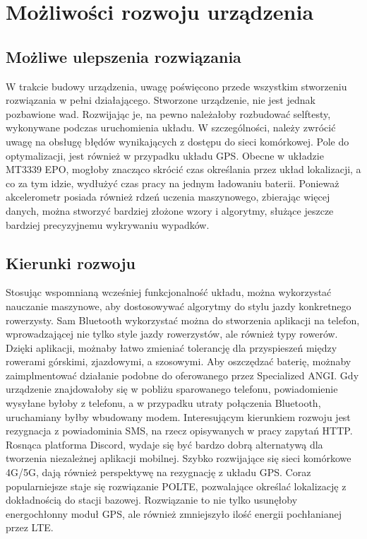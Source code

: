 \chapter{Możliwości rozwoju urządzenia}
\section{Możliwe ulepszenia rozwiązania}
W trakcie budowy urządzenia, uwagę poświęcono przede wszystkim stworzeniu rozwiązania w pełni działającego. Stworzone urządzenie, nie jest jednak pozbawione wad. Rozwijając je, na pewno należałoby rozbudować selftesty, wykonywane podczas uruchomienia układu. W szczególności, należy zwrócić uwagę na obsługę błędów wynikających z dostępu do sieci komórkowej. Pole do optymalizacji, jest również w przypadku układu GPS. Obecne w układzie MT3339 EPO, mogłoby znacząco skrócić czas określania przez układ lokalizacji, a co za tym idzie, wydłużyć czas pracy na jednym ładowaniu baterii.
\newline
Ponieważ akcelerometr posiada również rdzeń uczenia maszynowego, zbierając więcej danych, można stworzyć bardziej złożone wzory i algorytmy, służące jeszcze bardziej precyzyjnemu wykrywaniu wypadków.
\section{Kierunki rozwoju}
Stosując wspomnianą wcześniej funkcjonalność układu, można wykorzystać nauczanie maszynowe, aby dostosowywać algorytmy do stylu jazdy konkretnego rowerzysty. Sam Bluetooth wykorzystać można do stworzenia aplikacji na telefon, wprowadzającej nie tylko style jazdy rowerzystów, ale również typy rowerów. Dzięki aplikacji, możnaby łatwo zmieniać tolerancję dla przyspieszeń między rowerami górskimi, zjazdowymi, a szosowymi. Aby oszczędzać baterię, możnaby zaimplmentować działanie podobne do oferowanego przez Specialized ANGI. Gdy urządzenie znajdowałoby się w pobliżu sparowanego telefonu, powiadomienie wysyłane byłoby z telefonu, a w przypadku utraty połączenia Bluetooth, uruchamiany byłby wbudowany modem.
\newline
Interesującym kierunkiem rozwoju jest rezygnacja z powiadominia SMS, na rzecz opisywanych w pracy zapytań HTTP. Rosnąca platforma Discord, wydaje się być bardzo dobrą alternatywą dla tworzenia niezależnej aplikacji mobilnej.
\newline
Szybko rozwijające się sieci komórkowe 4G/5G, dają również perspektywę na rezygnację z układu GPS. Coraz popularniejsze staje się rozwiązanie POLTE\cite{polte}, pozwalające określać lokalizację z dokładnością do stacji bazowej. Rozwiązanie to nie tylko usunęłoby energochłonny moduł GPS, ale również zmniejszyło ilość energii pochłanianej przez LTE.
 